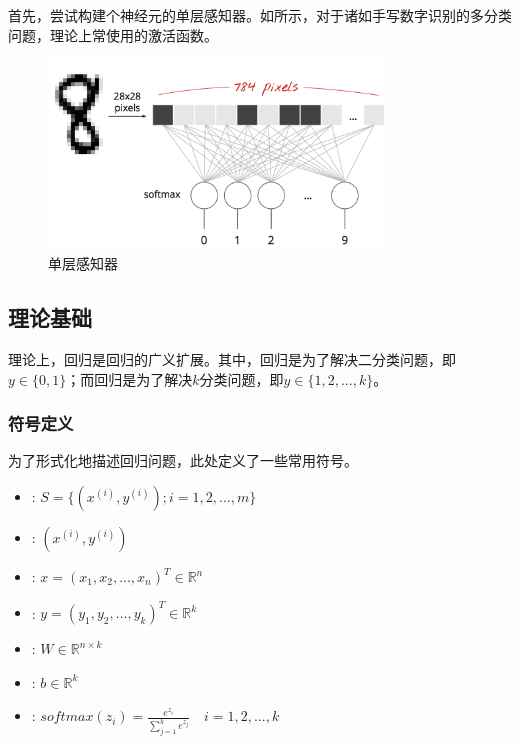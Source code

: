 \begin{content}

首先，尝试构建个神经元的单层感知器。如所示，对于诸如手写数字识别的多分类问题，理论上常使用的激活函数。

\begin{figure}[H]
\centering
\includegraphics[width=0.8\textwidth]{figures/mnist-slp.png}
\caption{单层感知器}
 \label{fig:mnist-slp}
\end{figure}

\subsection{理论基础}

理论上，回归是回归的广义扩展。其中，回归是为了解决二分类问题，即$y \in \{ 0,1\}$；而回归是为了解决$ k $分类问题，即$y \in \{ 1,2,...,k\}$。

\subsubsection{符号定义}

为了形式化地描述回归问题，此处定义了一些常用符号。

 \begin{itemize}
   \item {}: $ S = \{ ({x^{(i)}},{y^{(i)}});i = 1,2,...,m\} $
   \item {}: $ ({x^{(i)}},{y^{(i)}}) $
   \item {}: $ x = ({x_1},{x_2},...,{x_n})^{T}  \in {\mathbb{R}^n} $
   \item {}: $ y = ({y_1},{y_2},...,{y_k})^{T} \in {\mathbb{R}^k} $
   \item {}: $ W \in {\mathbb{R}^{n \times k}} $   
   \item {}: $ b \in {\mathbb{R}^k} $   
   \item {}: $ 
softmax {(z_i)} = \tfrac{{{e^{{z_i}}}}}{{\sum\limits_{j = 1}^k {{e^{{z_j}}}} }}  \quad i = 1,2,...,k
$
 \end{itemize}


\end{content}
